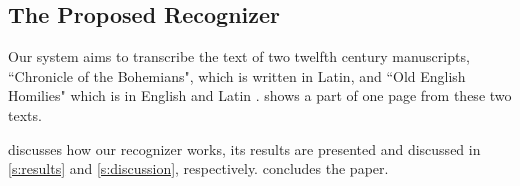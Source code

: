 \subsection{The Proposed Recognizer}
\label{ss:introduction:theMethod}
	Our system aims to transcribe the text of two twelfth century manuscripts, ``Chronicle of the Bohemians", which is written in Latin, and ``Old English Homilies" which is in English and Latin \cite{OldEnglishHomilies}.  shows a part of one page from these two texts.

	 discusses how our recognizer works, its results are presented and discussed in \cref{s:results} and \ref{s:discussion}, respectively.  concludes the paper.